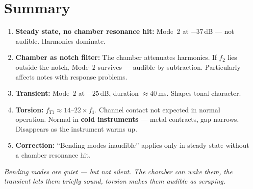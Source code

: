 \documentclass[11pt,a4paper]{article}
\begin{document}
\section{Summary}

\begin{enumerate}
\item \textbf{Steady state, no chamber resonance hit:} Mode~2 at $-37$\,dB ---
  not audible. Harmonics dominate.
\item \textbf{Chamber as notch filter:} The chamber attenuates harmonics.
  If $f_2$ lies outside the notch, Mode~2 survives --- audible
  by subtraction. Particularly affects notes with response problems.
\item \textbf{Transient:} Mode~2 at $-25$\,dB, duration $\approx 40$\,ms.
  Shapes tonal character.
\item \textbf{Torsion:} $f_{T1} \approx 14$--$22 \times f_1$.
  Channel contact not expected in normal operation.
  Normal in \textbf{cold instruments} --- metal contracts, gap narrows.
  Disappears as the instrument warms up.
\item \textbf{Correction:} ``Bending modes inaudible'' applies only in steady state
  without a chamber resonance hit.
\end{enumerate}

\bigskip
\textit{Bending modes are quiet --- but not silent.
The chamber can wake them, the transient lets them briefly sound,
torsion makes them audible as scraping.}
\end{document}
